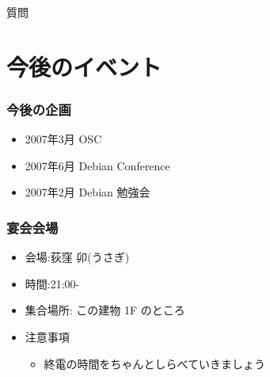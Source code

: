 \documentclass[cjk,dvipdfmx]{beamer}
\begin{document}
\begin{frame}{質問}

\end{frame}



\section{今後のイベント}

\begin{frame}
 \frametitle{今後の企画}
 \begin{itemize}
  \item 2007年3月 OSC
  \item 2007年6月 Debian Conference
  \item 2007年2月 Debian 勉強会
 \end{itemize}
\end{frame}

\begin{frame}
 \frametitle{宴会会場}
 \begin{itemize}
  \item 会場:荻窪 卯(うさぎ)
  \item 時間:21:00-
  \item 集合場所: この建物 1F のところ
  \item 注意事項
	\begin{itemize}
	 \item 終電の時間をちゃんとしらべていきましょう
	\end{itemize}
 \end{itemize}
\end{frame}
\end{document}
